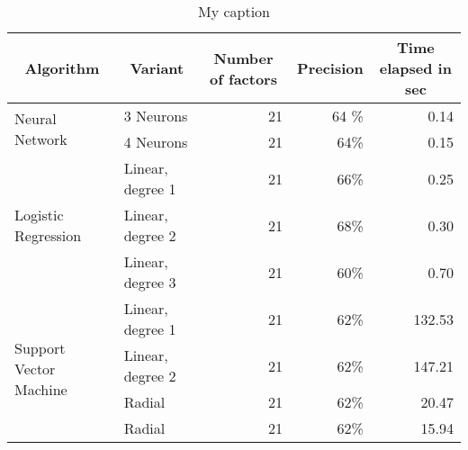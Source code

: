 \documentclass[10pt,letterpaper,oneside]{article}
\begin{document}
\begin{table}[]
	\centering
	\caption{My caption}
	\label{my-label}
	\begin{tabular}{llrrr}
		\hline
		\multicolumn{1}{c}{\textbf{Algorithm}}  & \multicolumn{1}{c}{\textbf{Variant}} & \multicolumn{1}{c}{\textbf{Number of factors}} & \multicolumn{1}{c}{\textbf{Precision}} & \multicolumn{1}{c}{\textbf{Time elapsed in sec}} \\ \hline
		\multirow{2}{*}{Neural Network}         & 3 Neurons                            & 21                                             & 64 \%                                  & 0.14                                             \\
		& 4 Neurons                            & 21                                             & 64\%                                  & 0.15                                             \\
		\multirow{3}{*}{Logistic Regression}    & Linear, degree 1                     & 21                                             & 66\%                                   & 0.25                                             \\
		& Linear, degree 2                     & 21                                             & 68\%                                   & 0.30                                             \\
		& Linear, degree 3                     & 21                                             & 60\%                                   & 0.70                                             \\
		\multirow{4}{*}{Support Vector Machine} & Linear, degree 1                     & 21                                             & 62\%                                   & 132.53                                           \\
		& Linear, degree 2                     & 21                                             & 62\%                                   & 147.21                                           \\
		& Radial                               & 21                                             & 62\%                                   & 20.47                                            \\
		& Radial                               & 21                                             & 62\%                                   & 15.94                                            \\

\end{tabular}
\end{table}
\end{document}
